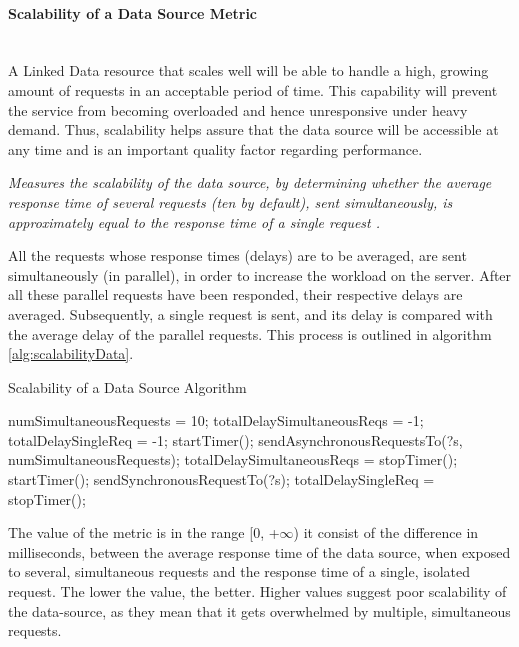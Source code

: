 

\paragraph{Scalability of a Data Source Metric} ~\\ %
A Linked Data resource that scales well will be able to handle a high, growing amount of requests in an acceptable period of time. This capability will prevent the service from becoming overloaded and hence unresponsive under heavy demand. Thus, scalability helps assure  that the data source will be accessible at any time and is an important quality factor regarding performance.
\begin{mdframed}[style=metricdefinition]
\emph{Measures the scalability of the data source, by determining whether the average response time of several requests (ten by default), sent simultaneously, is approximately equal to the response time of a single request \cite{Flemming2008}.}
\end{mdframed}

All the requests whose response times (delays) are to be averaged, are sent simultaneously (in parallel), in order to increase the workload on the server. After all these parallel requests have been responded, their respective delays are averaged. Subsequently, a single request is sent, and its delay is compared with the average delay of the parallel requests. This process is outlined in algorithm \ref{alg:scalabilityData}.
\begin{algorithm}
\caption{Scalability of a Data Source Algorithm} \label{alg:scalabilityData}
\begin{algorithmic}[1]
\State numSimultaneousRequests = 10;
\State totalDelaySimultaneousReqs = -1;
\State totalDelaySingleReq = -1;
\EndProcedure
{}
\State startTimer();
\State sendAsynchronousRequestsTo(?s, numSimultaneousRequests);
\State totalDelaySimultaneousReqs = stopTimer();
\State startTimer();
\State sendSynchronousRequestTo(?s);
\State totalDelaySingleReq = stopTimer();
\EndIf
{}
\EndProcedure
\end{algorithmic}
\end{algorithm}
The value of the metric is in the range [0, +$\infty$) it consist of the difference in milliseconds, between the average response time of the data source, when exposed to several, simultaneous requests and the response time of a single, isolated request. The lower the value, the better. Higher values suggest poor scalability of the data-source, as they mean that it gets overwhelmed by multiple, simultaneous requests.

